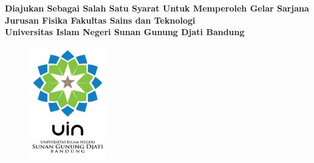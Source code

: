 %
%
\begin{titlepage}
\begin{center}
\large \bf \Judul \\
\vspace{2cm}
{\normalsize \bf \Model}\\
\vspace{1cm}
{\small \bf Diajukan Sebagai Salah Satu Syarat Untuk Memperoleh Gelar Sarjana \\
            Jurusan Fisika Fakultas Sains dan Teknologi \\
            Universitas Islam Negeri Sunan Gunung Djati Bandung \\}
\vspace{1cm}
\begin{figure}[h]
	\centering
		\includegraphics[width=0.30\textwidth]{template/logo-uin-1}
	\label{fig:uin}
\end{figure}
{\small \bf \underline{\Peneliti}  \\
\nim}\\
\vspace{2cm}
{\normalsize \bf \Jur  \\
\Fak  \\
\Kampus  \\
\tahun}
\end{center}
\end{titlepage}
%